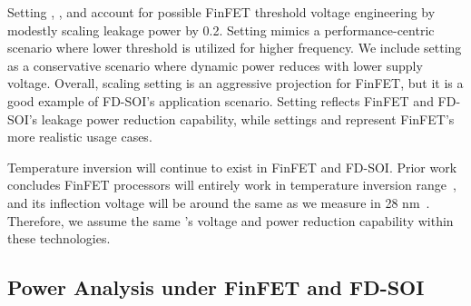 Setting , , and  account for possible FinFET threshold voltage engineering by modestly scaling leakage power by 0.2. Setting  mimics a performance-centric scenario where lower threshold is utilized for higher frequency. We include setting  as a conservative scenario where dynamic power reduces with lower supply voltage. Overall, scaling setting  is an aggressive projection for FinFET, but it is a good example of FD-SOI's application scenario. Setting  reflects FinFET and FD-SOI's leakage power reduction capability, while settings  and  represent FinFET's more realistic usage cases. 

Temperature inversion will continue to exist in FinFET and FD-SOI. Prior work concludes FinFET processors will entirely work in temperature inversion range~\cite{lee2014dynamic,cai2015tei}, and its inflection voltage will be around the same as we measure in 28 nm~\cite{lee2014dynamic}. Therefore, we assume the same \tistate's voltage and power reduction capability within these technologies. 

\subsection{\tistate Power Analysis under FinFET and FD-SOI}

